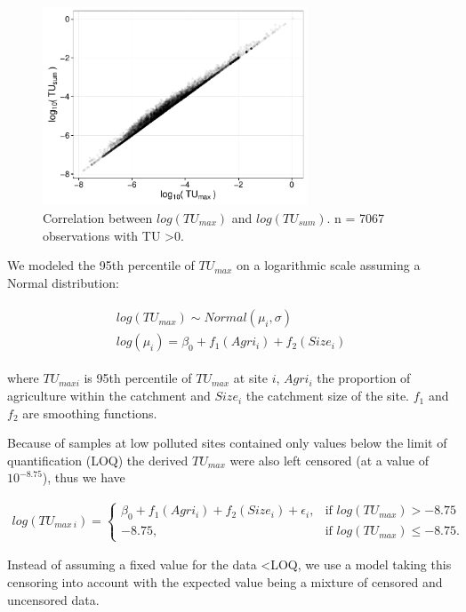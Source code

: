 \documentclass[pdftex,a4paper]{scrreprt}
\begin{document}
\begin{figure}[h]
	\centering
	\includegraphics[width = 0.7\textwidth]{tusummax}
	\caption{Correlation between $log(TU_{max})$ and $log(TU_{sum})$. n = 7067 observations with TU \textgreater 0.}
	\label{fig:tusummax}
\end{figure}

We modeled the 95th percentile of $TU_{max}$ on a logarithmic scale assuming a Normal distribution:

\begin{align}
\begin{split}
  log(TU_{max}) \sim Normal(\mu_i, \sigma) \\
  log(\mu_i)= \beta_0 + f_1(Agri_i) + f_2(Size_i)
\end{split}
\end{align}

where $TU_{max i}$ is 95th percentile of $TU_{max}$ at site $i$, $Agri_i$ the proportion of agriculture within the catchment and $Size_i$ the catchment size of the site.  
$f_1$ and $f_2$ are smoothing functions.

Because of samples at low polluted sites contained only values below the limit of quantification (LOQ) the derived $TU_{max}$ were also left censored (at a value of $10^{-8.75}$), thus we have

\begin{align}
  log(TU_{max~i})=\begin{cases}
    \beta_0 + f_1(Agri_i) + f_2(Size_i) + \epsilon_i, & \text{if $log(TU_{max}) > -8.75 $}\\
    -8.75, & \text{if $log(TU_{max}) \le -8.75 $}.
  \end{cases}
\end{align}


Instead of assuming a fixed value for the data \textless LOQ, we use a model taking this censoring into account \citep{helsel_fabricating_2006} with the expected value being a mixture of censored and uncensored data.
\end{document}
